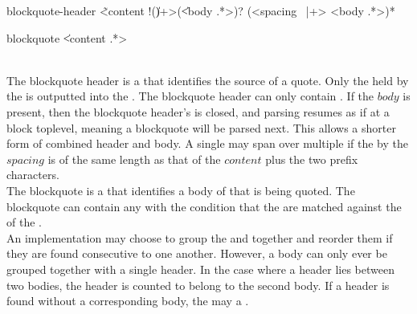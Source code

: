 \begin{identifier}{blockquote-header}
\~ <content !(\| )+>(\| <body .*>)?
(<spacing ~|+> <body .*>)*
\end{identifier}
\begin{identifier}{blockquote}
\| <content .*>
\end{identifier}
 \\

The blockquote header is a  that identifies the source of a quote. Only the  held by the  is outputted into the . The blockquote header  can only contain . If the \inline$body$  is present, then the blockquote header's  is closed, and parsing resumes as if at a block toplevel, meaning a blockquote will be parsed next. This allows a shorter form of combined header and body. A single  may span over multiple  if the   by the \inline$spacing$  is of the same length as that of the \inline$content$  plus the two prefix characters. \\

The blockquote is a  that identifies a body of  that is being quoted. The blockquote can contain any  with the condition that the  are matched against the  of the . \\

An implementation may choose to group the  and  together and reorder them if they are found consecutive to one another. However, a body can only ever be grouped together with a single header. In the case where a header lies between two bodies, the header is counted to belong to the second body. If a header is found without a corresponding body, the  may  a . \\

